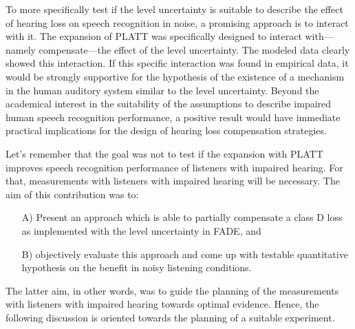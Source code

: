 \documentclass[10pt,a4paper,twocolumn]{article}
\begin{document}
To more specifically test if the level uncertainty is suitable to describe the effect of hearing loss on speech recognition in noise, a promising approach is to interact with it.
%
The expansion of PLATT was specifically designed to interact with---namely compensate---the effect of the level uncertainty.
%
The modeled data clearly showed this interaction.
%
If this specific interaction was found in empirical data, it would be strongly supportive for the hypothesis of the existence of a mechanism in the human auditory system similar to the level uncertainty.
%
Beyond the academical interest in the suitability of the assumptions to describe impaired human speech recognition performance, a positive result would have immediate practical implications for the design of hearing loss compensation strategies.

Let's remember that the goal was not to test if the expansion with PLATT improves speech recognition performance of listeners with impaired hearing.
%
For that, measurements with listeners with impaired hearing will be necessary.
%
The aim of this contribution was to:
%
\begin{itemize}
	\item[A)] Present an approach which is able to partially compensate a class D loss as implemented with the level uncertainty in FADE, and
	\item[B)] objectively evaluate this approach and come up with testable quantitative hypothesis on the benefit in noisy listening conditions.
\end{itemize}
%
The latter aim, in other words, was to guide the planning of the measurements with listeners with impaired hearing towards optimal evidence.
%
Hence, the following discussion is oriented towards the planning of a suitable experiment.
\end{document}
